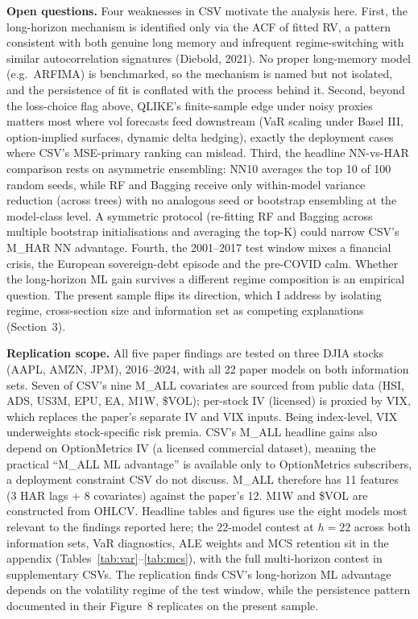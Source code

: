 \documentclass[twocolumn,9pt]{extarticle}
\newcommand{\lead}[1]{\textbf{#1}\hspace{0.25em}\ignorespaces}
\begin{document}
\lead{Open questions.} Four weaknesses in CSV motivate the analysis
here. First, the long-horizon mechanism is identified only via the
ACF of fitted RV, a pattern consistent with both genuine long memory
and infrequent regime-switching with similar autocorrelation
signatures (Diebold, 2021). No proper long-memory model (e.g.\
ARFIMA) is benchmarked, so the mechanism is named but not isolated,
and the persistence of fit is conflated with the process behind it.
Second, beyond the loss-choice flag above, QLIKE's finite-sample
edge under noisy proxies matters most where vol forecasts feed
downstream (VaR scaling under Basel III, option-implied surfaces,
dynamic delta hedging), exactly the deployment cases where CSV's
MSE-primary ranking can mislead. Third, the headline NN-vs-HAR
comparison rests on asymmetric ensembling: NN10 averages the top 10
of 100 random seeds, while RF and Bagging receive only within-model
variance reduction (across trees) with no analogous seed or
bootstrap ensembling at the model-class level. A symmetric protocol
(re-fitting RF and Bagging across multiple bootstrap initialisations
and averaging the top-K) could narrow CSV's M\_HAR NN advantage.
Fourth, the 2001--2017 test window mixes a financial crisis, the
European sovereign-debt episode and the pre-COVID calm. Whether the
long-horizon ML gain survives a different regime composition is an
empirical question. The present sample flips its direction, which I
address by isolating regime, cross-section size and information set
as competing explanations (Section~3).

\lead{Replication scope.} All five paper findings are tested on
three DJIA stocks (AAPL, AMZN, JPM), 2016--2024, with all 22 paper
models on both information sets. Seven of CSV's nine M\_ALL
covariates are sourced from public data (HSI, ADS, US3M, EPU, EA,
M1W, \$VOL); per-stock IV (licensed) is proxied by VIX, which
replaces the paper's separate IV and VIX inputs. Being index-level,
VIX underweights stock-specific risk premia. CSV's M\_ALL headline
gains also depend on OptionMetrics IV (a licensed commercial
dataset), meaning the practical ``M\_ALL ML advantage'' is available
only to OptionMetrics subscribers, a deployment constraint CSV do
not discuss. M\_ALL therefore has 11 features (3 HAR lags + 8
covariates) against the paper's 12. M1W and \$VOL are constructed
from OHLCV. Headline tables and figures use the eight models most
relevant to the findings reported here; the 22-model contest at
$h=22$ across both information sets, VaR diagnostics, ALE weights
and MCS retention sit in the appendix (Tables~\ref{tab:var}--\ref{tab:mcs}), with the full
multi-horizon contest in supplementary CSVs. The replication finds
CSV's long-horizon ML advantage depends on the volatility regime of
the test window, while the persistence pattern documented in their
Figure~8 replicates on the present sample.
\end{document}
